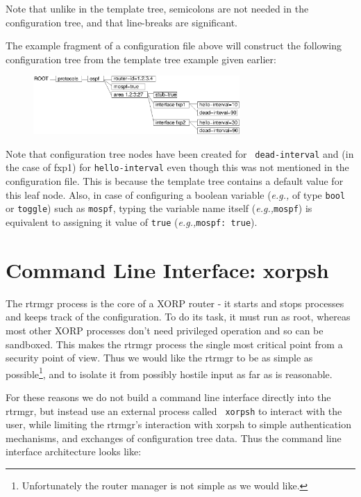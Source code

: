 \documentclass[11pt]{article}
\newcommand{\eg}{\emph{e.g.,}\xspace}
\begin{document}
Note that unlike in the template tree, semicolons are not needed in the
configuration tree, and that line-breaks are significant.

The example fragment of a configuration file above will construct the
following configuration tree from the template tree example given
earlier:

\begin{figure}[htb]
\centerline{\includegraphics[width=0.7\textwidth]{figs/config}}
\vspace{.05in}
\end{figure}

Note that configuration tree nodes have been created for {\tt
dead-interval} and (in the case of fxp1) for {\tt hello-interval} even
though this was not mentioned in the configuration file.  This is
because the template tree contains a default value for this leaf node.
Also, in case of configuring a boolean variable (\eg of type {\tt bool} or
{\tt toggle}) such as {\tt mospf}, typing the variable name itself
(\eg \verb=mospf=) is equivalent to assigning it value of {\tt true}
(\eg \verb=mospf: true=).

\newpage

\section{Command Line Interface: xorpsh}

The rtrmgr process is the core of a XORP router - it starts and stops
processes and keeps track of the configuration.  To do its task, it
must run as root, whereas most other XORP processes don't need
privileged operation and so can be sandboxed.  This makes the rtrmgr
process the single most critical point from a security point of view.
Thus we would like the rtrmgr to be as simple as
possible\footnote{Unfortunately the router manager is not simple as we
would like.}, and to isolate it from possibly hostile input as far as
is reasonable.

For these reasons we do not build a command line interface directly
into the rtrmgr, but instead use an external process called {\tt
xorpsh} to interact with the user, while limiting the rtrmgr's
interaction with xorpsh to simple authentication mechanisms, and
exchanges of configuration tree data.  Thus the command line interface
architecture looks like:
\end{document}
